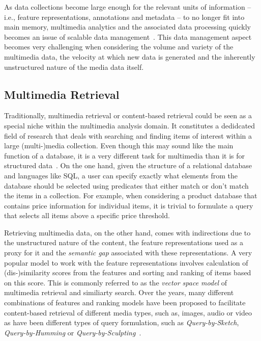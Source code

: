 As data collections become large enough for the relevant units of information -- i.e., feature representations, annotations and metadata -- to no longer fit into main memory, multimedia analytics and the associated data processing quickly becomes an issue of scalable data management~\cite{Jonson:2016}. This data management aspect becomes very challenging when considering the volume and variety of the multimedia data, the velocity at which new data is generated and the inherently unstructured nature of the media data itself.

\subsection{Multimedia Retrieval}

Traditionally, multimedia retrieval or content-based retrieval could be seen as a special niche within the  multimedia analysis domain. It constitutes a dedidcated field of research that deals with searching and finding items of interest within a large (multi-)media collection. Even though this may sound like the main function of a database, it is a very different task for multimedia than it is for structured data~\cite{Blanken:2007multimedia}. On the one hand, given the structure of a relational database and languages like SQL, a user can specify exactly what elements from the database should be selected using predicates that either match or don't match the items in a collection. For example, when considering a product database that contains price information for individual items, it is trivial to formulate a query that selects all items above a specific price threshold.

Retrieving multimedia data, on the other hand, comes with indirections due to the unstructured nature of the content, the feature representations used as a proxy for it and the \emph{semantic gap} associated with these representations. A very popular model to work with the feature representations involves calculation of (dis-)similarity scores from the features and sorting and ranking of items based on this score. This is commonly referred to as the \emph{vector space model} of multimedia retrieval and similiarty search. Over the years, many different combinations of features and ranking models have been proposed to facilitate content-based retrieval of different media types, such as, images, audio or video  as have been different types of query formulation, such as \emph{Query-by-Sketch}, \emph{Query-by-Humming} or \emph{Query-by-Sculpting}~\cite{Cao:2010mind,Ghias:1995query,Boerlin:20203d}. 

